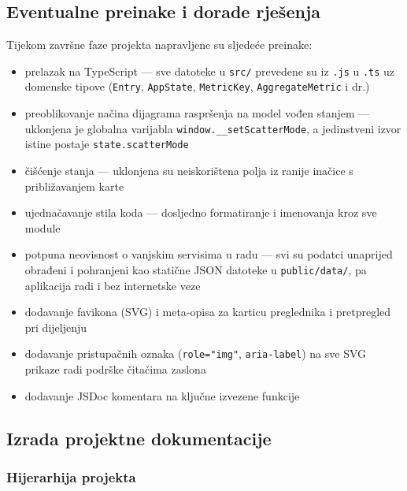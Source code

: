 \documentclass[a4paper,11pt]{article}
\begin{document}
\subsection{Eventualne preinake i dorade rješenja}

Tijekom završne faze projekta napravljene su sljedeće preinake:

\begin{itemize}
  \item prelazak na TypeScript --- sve datoteke u \texttt{src/} prevedene su iz \texttt{.js} u \texttt{.ts} uz domenske tipove (\texttt{Entry}, \texttt{AppState}, \texttt{MetricKey}, \texttt{AggregateMetric} i dr.)
  \item preoblikovanje načina dijagrama raspršenja na model vođen stanjem --- uklonjena je globalna varijabla \texttt{window.\_\_setScatterMode}, a jedinstveni izvor istine postaje \texttt{state.scatterMode}
  \item čišćenje stanja --- uklonjena su neiskorištena polja iz ranije inačice s približavanjem karte
  \item ujednačavanje stila koda --- dosljedno formatiranje i imenovanja kroz sve module
  \item potpuna neovisnost o vanjskim servisima u radu --- svi su podatci unaprijed obrađeni i pohranjeni kao statične JSON datoteke u \texttt{public/data/}, pa aplikacija radi i bez internetske veze
  \item dodavanje favikona (SVG) i meta-opisa za karticu preglednika i pretpregled pri dijeljenju
  \item dodavanje pristupačnih oznaka (\texttt{role="img"}, \texttt{aria-label}) na sve SVG prikaze radi podrške čitačima zaslona
  \item dodavanje JSDoc komentara na ključne izvezene funkcije
\end{itemize}

\subsection{Izrada projektne dokumentacije}

\subsubsection*{Hijerarhija projekta}
\end{document}
